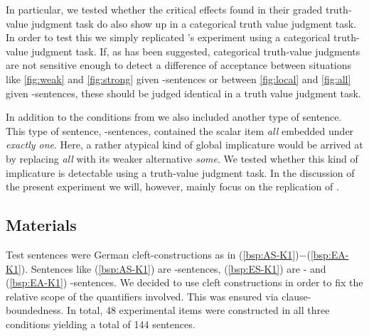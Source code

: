 \documentclass[fleqn,reqno,10pt,draft]{article}
\newcommand{\as}{\acro{as}}
\renewcommand{\es}{\acro{es}}
\newcommand{\ea}{\acro{ea}}
\begin{document}
In particular, we tested whether the critical effects \citet{ChemlaSpector2010:Experimental-Ev} found in their graded truth-value judgment task do also show up in a categorical truth value judgment task. In order to test this we simply replicated \citeauthor{ChemlaSpector2010:Experimental-Ev}'s experiment 
using a categorical truth-value judgment task. If, as has been suggested, categorical truth-value judgments are not sensitive enough to detect a difference of acceptance between situations like \ref{fig:weak} and \ref{fig:strong} given \as-sentences or between \ref{fig:local} and \ref{fig:all} given \es-sentences, these should be judged identical in a truth value judgment task.

In addition to the conditions from  \citet{ChemlaSpector2010:Experimental-Ev} we also included another type of sentence. This type of sentence, \ea-sentences, contained the scalar item {\it all} embedded under {\it exactly one}. Here, a rather atypical kind of global implicature would be arrived at by replacing {\it all} with its weaker alternative {\it some}.  We tested whether this kind of implicature is detectable using a truth-value judgment task. In the discussion of the present experiment we will, however, mainly focus on the replication of  \citet{ChemlaSpector2010:Experimental-Ev}.

\subsection{Materials}
Test sentences were German cleft-constructions as in (\ref{bsp:AS-K1})$-$(\ref{bsp:EA-K1}). Sentences like (\ref{bsp:AS-K1}) are \as-sentences, (\ref{bsp:ES-K1}) are \es- and  (\ref{bsp:EA-K1}) \ea-sentences. We decided to use cleft constructions in order to fix the relative scope of the quantifiers involved. This was ensured via clause-boundedness. In total, 48 experimental items were constructed in all three conditions yielding a total of 144 sentences.
\end{document}
